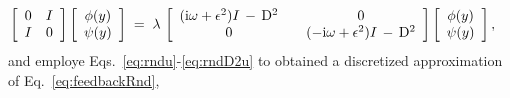 \documentclass[%
secnumarabic,%
 amssymb, amsmath,%
 aps,prf,superscriptaddress,longbibliography
frontmatterverbose,
]{revtex4-2}
\begin{document}
\begin{subequations}
\begin{align}
  \left[\begin{array}{cc}
    0 & I\\
    I & 0
  \end{array}\right]\left[\begin{array}{c}
    \phi (y)\\
    \psi (y)
  \end{array}\right]\;&=\;\lambda \,\left[\begin{array}{ccc}
    (\mathrm i \omega + \epsilon^2) I \,-\, \mathrm D^2 & & 0\\
    0 && (-\mathrm i \omega + \epsilon^2) I \,-\, \mathrm D^2
  \end{array}\right] \left[\begin{array}{c}
    \phi (y)\\
    \psi (y)
  \end{array}\right],\label{eq:feedbackRnda}
\end{align}
\end{subequations}
and employe Eqs.~\eqref{eq:rndu}-\eqref{eq:rndD2u} to obtained a discretized approximation of Eq.~\eqref{eq:feedbackRnd}, 
\end{document}
